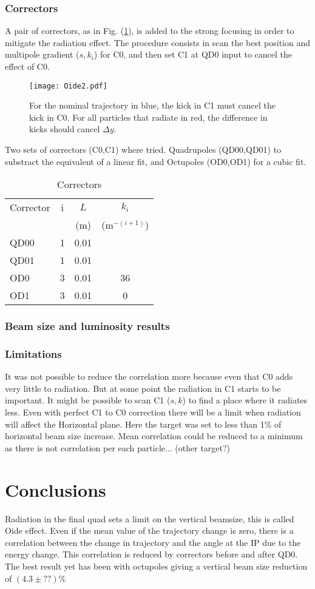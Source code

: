 \subsubsection{Correctors}
A pair of correctors, as in Fig. (\ref{f:corrector}), is added to the strong focusing in order to mitigate the radiation effect. The procedure consists in scan the best position and multipole gradient ($s,k_i$) for C0, and then set C1 at QD0 input to cancel the effect of C0.\par
\begin{figure}[!htb]
\centering
\texttt{[image: Oide2.pdf]}\caption{For the nominal trajectory in blue, the kick in C1 must cancel the kick in C0. For all particles that radiate in red, the difference in kicks should cancel $\Delta y$.}\label{f:corrector}
\end{figure}
Two sets of correctors (C0,C1) where tried. Quadrupoles (QD00,QD01) to substract the equivalent of a linear fit, and Octupoles (OD0,OD1) for a cubic fit.
\begin{table}[!hbt]
\centering
\begin{tabular}{l||c|c|c}\hline\hline
Corrector & i & $L$ & $k_{i}$\\
& & (m)& (m$^{-(i+1)}$)\\\hline
QD00 & 1 & 0.01 &\\
QD01 & 1 & 0.01 &\\\hline
OD0 & 3 & 0.01 & 36\\
OD1 & 3 & 0.01 & 0\\\hline
\end{tabular}\caption{Correctors}\label{t:correctors}
\end{table}

\subsubsection{Beam size and luminosity results }

\subsubsection{Limitations}
It was not possible to reduce the correlation more because even that C0 adds very little to radiation. But at some point the radiation in C1 starts to be important. It might be possible to scan  C1 ($s,k$) to find a place where it radiates less. Even with perfect C1 to C0 correction there will be a limit when radiation will affect the Horizontal plane. Here the target was set to less than 1\% of horizontal beam size increase. Mean correlation could be reduced to a minimum as there is not correlation per each particle... (other target?)

\section{Conclusions}
Radiation in the final quad sets a limit on the vertical beamsize, this is called Oide effect. Even if the mean value of the trajectory change is zero, there is a correlation between the change in trajectory and the angle at the IP due to the energy change. This correlation is reduced by correctors before and after QD0. The best result yet has been with octupoles giving a vertical beam size reduction of $(4.3\pm??)$\%
